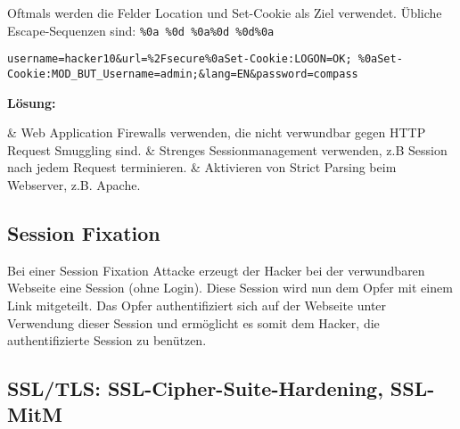 Oftmals werden die Felder Location und Set-Cookie als Ziel verwendet. Übliche Escape-Sequenzen sind: \lstinline|%0a %0d %0a%0d %0d%0a|

\begin{lstlisting}[language={},caption=Beispiel eines Präparierten Request zur Umgehung einer Pre-Authentication]
username=hacker10&url=%2Fsecure%0aSet-Cookie:LOGON=OK; %0aSet-Cookie:MOD_BUT_Username=admin;&lang=EN&password=compass
\end{lstlisting}

\textbf{Lösung:}
\begin{easylist}
	& Web Application Firewalls verwenden, die nicht verwundbar gegen HTTP Request Smuggling sind.
	& Strenges Sessionmanagement verwenden, z.B Session nach jedem Request terminieren.
	& Aktivieren von Strict Parsing beim Webserver, z.B. Apache.
\end{easylist} 

\subsection{Session Fixation}
Bei einer Session Fixation Attacke erzeugt der Hacker bei der verwundbaren Webseite eine Session (ohne Login). Diese Session wird nun dem Opfer mit einem Link mitgeteilt. Das Opfer authentifiziert sich auf der Webseite unter Verwendung dieser Session und ermöglicht es somit dem Hacker, die authentifizierte Session zu benützen.

\subsection{SSL/TLS: SSL-Cipher-Suite-Hardening, SSL-MitM}
